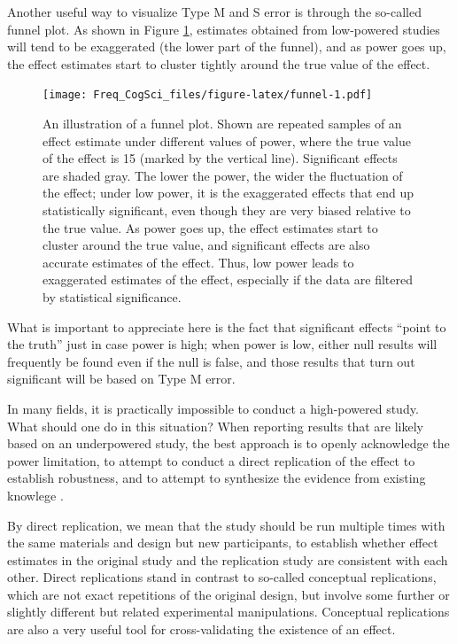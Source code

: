 \documentclass[12pt,]{krantz}
\begin{document}
Another useful way to visualize Type M and S error is through the so-called funnel plot. As shown in Figure \ref{fig:funnel}, estimates obtained from low-powered studies will tend to be exaggerated (the lower part of the funnel), and as power goes up, the effect estimates start to cluster tightly around the true value of the effect.

\begin{figure}
\centering
\texttt{[image: Freq\_CogSci\_files/figure-latex/funnel-1.pdf]}
\caption{\label{fig:funnel}An illustration of a funnel plot. Shown are repeated samples of an effect estimate under different values of power, where the true value of the effect is 15 (marked by the vertical line). Significant effects are shaded gray. The lower the power, the wider the fluctuation of the effect; under low power, it is the exaggerated effects that end up statistically significant, even though they are very biased relative to the true value. As power goes up, the effect estimates start to cluster around the true value, and significant effects are also accurate estimates of the effect. Thus, low power leads to exaggerated estimates of the effect, especially if the data are filtered by statistical significance.}
\end{figure}

What is important to appreciate here is the fact that significant effects ``point to the truth'' just in case power is high; when power is low, either null results will frequently be found even if the null is false, and those results that turn out significant will be based on Type M error.

In many fields, it is practically impossible to conduct a high-powered study. What should one do in this situation? When reporting results that are likely based on an underpowered study, the best approach is to openly acknowledge the power limitation, to attempt to conduct a direct replication of the effect to establish robustness, and to attempt to synthesize the evidence from existing knowlege \citep{cumming2014new}.

By direct replication, we mean that the study should be run multiple times with the same materials and design but new participants, to establish whether effect estimates in the original study and the replication study are consistent with each other. Direct replications stand in contrast to so-called conceptual replications, which are not exact repetitions of the original design, but involve some further or slightly different but related experimental manipulations. Conceptual replications are also a very useful tool for cross-validating the existence of an effect.
\end{document}
